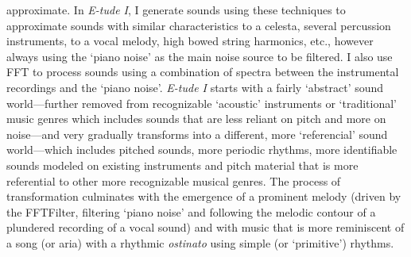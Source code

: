 approximate. In \emph{E-tude I}, I generate sounds using these techniques to approximate sounds with similar characteristics to a celesta, several percussion instruments, to a vocal melody, high bowed string harmonics, etc., however always using the `piano noise' as the main noise source to be filtered. I also use FFT to process sounds using a combination of spectra between the instrumental recordings and the `piano noise'. \emph{E-tude I} starts with a fairly `abstract' sound world---further removed from recognizable `acoustic' instruments or `traditional' music genres which includes sounds that are less reliant on pitch and more on noise---and very gradually transforms into a different, more `referencial' sound world---which includes pitched sounds, more periodic rhythms, more identifiable sounds modeled on existing instruments and pitch material that is more referential to other more recognizable musical genres. The process of transformation culminates with the emergence of a prominent melody (driven by the FFTFilter, filtering `piano noise' and following the melodic contour of a plundered recording of a vocal sound) and with music that is more reminiscent of a song (or aria) with a rhythmic \emph{ostinato}  using simple (or `primitive') rhythms.

